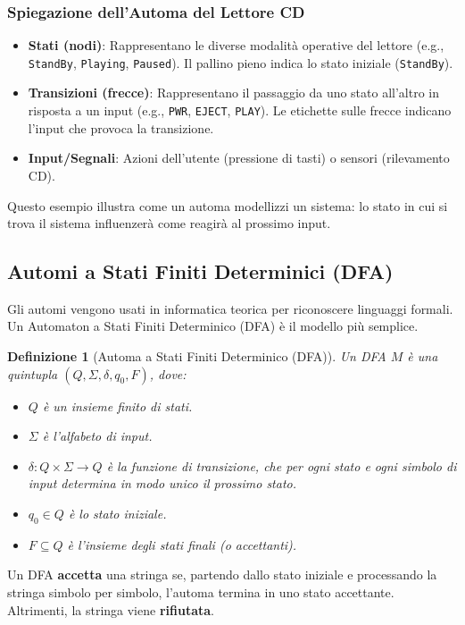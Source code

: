 \documentclass[a4paper]{article}
\newtheorem{definition}{Definizione}
\begin{document}
\subsubsection{Spiegazione dell'Automa del Lettore CD}
\begin{itemize}
    \item \textbf{Stati (nodi)}: Rappresentano le diverse modalità operative del lettore (e.g., \texttt{StandBy}, \texttt{Playing}, \texttt{Paused}). Il pallino pieno indica lo stato iniziale (\texttt{StandBy}).
    \item \textbf{Transizioni (frecce)}: Rappresentano il passaggio da uno stato all'altro in risposta a un input (e.g., \texttt{PWR}, \texttt{EJECT}, \texttt{PLAY}). Le etichette sulle frecce indicano l'input che provoca la transizione.
    \item \textbf{Input/Segnali}: Azioni dell'utente (pressione di tasti) o sensori (rilevamento CD).
\end{itemize}
Questo esempio illustra come un automa modellizzi un sistema: lo stato in cui si trova il sistema influenzerà come reagirà al prossimo input.

\subsection{Automi a Stati Finiti Determinici (DFA)}
Gli automi vengono usati in informatica teorica per riconoscere linguaggi formali. Un Automaton a Stati Finiti Determinico (DFA) è il modello più semplice.

\begin{definition}[Automa a Stati Finiti Determinico (DFA)]
Un DFA $M$ è una quintupla $(Q, \Sigma, \delta, q_0, F)$, dove:
\begin{itemize}
    \item $Q$ è un insieme finito di stati.
    \item $\Sigma$ è l'alfabeto di input.
    \item $\delta: Q \times \Sigma \to Q$ è la funzione di transizione, che per ogni stato e ogni simbolo di input determina in modo unico il prossimo stato.
    \item $q_0 \in Q$ è lo stato iniziale.
    \item $F \subseteq Q$ è l'insieme degli stati finali (o accettanti).
\end{itemize}
\end{definition}

Un DFA \textbf{accetta} una stringa se, partendo dallo stato iniziale e processando la stringa simbolo per simbolo, l'automa termina in uno stato accettante. Altrimenti, la stringa viene \textbf{rifiutata}.
\end{document}

